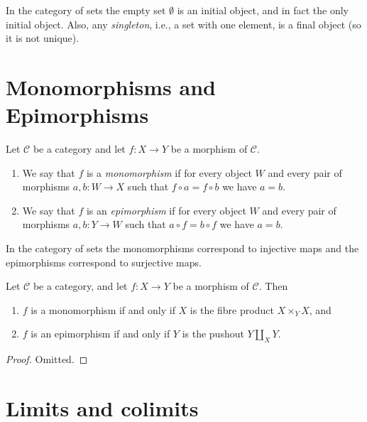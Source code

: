 \noindent
In the category of sets the empty set $\emptyset$ is an
initial object, and in fact the only initial object.
Also, any {\it singleton}, i.e., a set with one element,
is a final object (so it is not unique).




\section{Monomorphisms and Epimorphisms}
\label{section-mono-epi}

\begin{definition}
\label{definition-mono-epi}
Let $\mathcal{C}$ be a category and let $f : X \to Y$ be
a morphism of $\mathcal{C}$.
\begin{enumerate}
\item We say that $f$ is a {\it monomorphism} if for every object
$W$ and every pair of morphisms $a, b : W \to X$ such that
$f \circ a = f \circ b$ we have $a = b$.
\item We say that $f$ is an {\it epimorphism} if for every object
$W$ and every pair of morphisms $a, b : Y \to W$ such that
$a \circ f = b \circ f$ we have $a = b$.
\end{enumerate}
\end{definition}

\begin{example}
\label{example-mono-epi-sets}
In the category of sets the monomorphisms correspond to injective
maps and the epimorphisms correspond to surjective maps.
\end{example}

\begin{lemma}
\label{lemma-characterize-mono-epi}
Let $\mathcal{C}$ be a category, and let $f : X \to Y$ be
a morphism of $\mathcal{C}$. Then
\begin{enumerate}
\item $f$ is a monomorphism if and only if $X$ is the fibre
product $X \times_Y X$, and
\item $f$ is an epimorphism if and only if $Y$ is the pushout
$Y \amalg_X Y$.
\end{enumerate}
\end{lemma}

\begin{proof}
Omitted.
\end{proof}





\section{Limits and colimits}
\label{section-limits}


